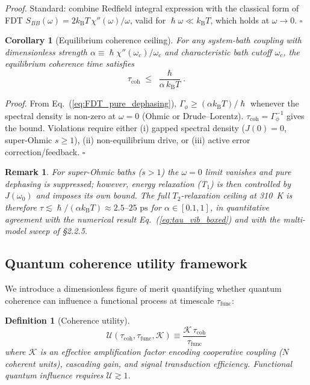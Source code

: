 \documentclass[twocolumn,10pt]{article}
\renewcommand{\hbar}{\hslash}
\newcommand{\kB}{k_{\text{B}}}
\newcommand{\ps}{\text{~ps}}
\newtheorem{corollary}{Corollary}
\newtheorem{definition}{Definition}
\newtheorem{remark}{Remark}
\begin{document}
\textit{Proof.} Standard: combine Redfield integral expression
\cite{BreuerPetruccione2002} with the classical form of FDT
$S_{BB}(\omega)=2\kB T\,\chi''(\omega)/\omega$, valid for
$\hbar\omega\ll\kB T$, which holds at $\omega\to 0$. \hfill$\square$

\begin{corollary}[Equilibrium coherence ceiling]\label{cor:ceiling}
For any system-bath coupling with dimensionless strength
$\alpha\equiv \hbar\chi''(\omega_c)/\omega_c$ and characteristic bath
cutoff $\omega_c$, the equilibrium coherence time satisfies
\begin{equation}
\tau_{\text{coh}} \;\le\; \frac{\hbar}{\alpha\,\kB T}.
\label{eq:coh_bound}
\end{equation}
\end{corollary}

\textit{Proof.} From Eq.~(\ref{eq:FDT_pure_dephasing}), $\Gamma_\phi
\ge (\alpha\kB T)/\hbar$ whenever the spectral density is non-zero at
$\omega=0$ (Ohmic or Drude--Lorentz). $\tau_{\text{coh}}=\Gamma_\phi^{-1}$
gives the bound. Violations require either (i) gapped spectral density
($J(0)=0$, super-Ohmic $s\ge 1$), (ii) non-equilibrium drive, or (iii)
active error correction/feedback. \hfill$\square$

\begin{remark}
For super-Ohmic baths ($s>1$) the $\omega=0$ limit vanishes and pure
dephasing is suppressed; however, \emph{energy relaxation} (T$_1$) is then
controlled by $J(\omega_0)$ and imposes its own bound. The full
$T_2$-relaxation ceiling at 310~K is therefore
$\tau\lesssim\hbar/(\alpha\kB T)\approx 2.5\text{--}25\ps$ for
$\alpha\in[0.1,1]$, in quantitative agreement with the numerical result
Eq.~(\ref{eq:tau_vib_boxed}) and with the multi-model sweep of \S 2.2.5.
\end{remark}



\subsection{Quantum coherence utility framework}

We introduce a dimensionless figure of merit quantifying whether quantum
coherence can influence a functional process at timescale $\tau_{\text{func}}$:

\begin{definition}[Coherence utility]
\label{def:utility}
\begin{equation}
\mathcal{U}(\tau_{\text{coh}}, \tau_{\text{func}}, \mathcal{K})
\equiv \frac{\mathcal{K}\,\tau_{\text{coh}}}{\tau_{\text{func}}}
\label{eq:utility}
\end{equation}
where $\mathcal{K}$ is an effective amplification factor encoding
cooperative coupling ($N$ coherent units), cascading gain, and signal
transduction efficiency. Functional quantum influence requires
$\mathcal{U} \gtrsim 1$.
\end{definition}
\end{document}

